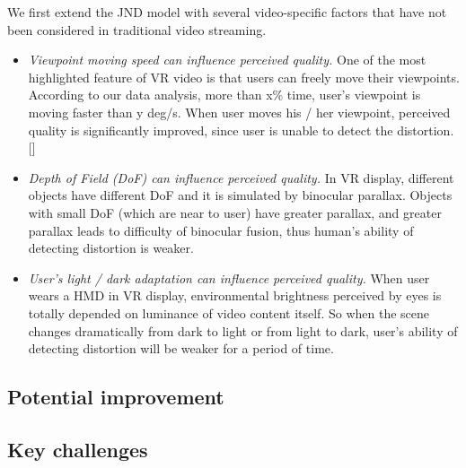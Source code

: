 We first extend the JND model with several \vr video-specific factors that have not been considered in traditional video streaming.

\begin{itemize}

\item \emph{Viewpoint moving speed can influence perceived quality.} One of the most highlighted feature of VR video is that users can freely move their viewpoints. According to our data analysis, more than x\% time, user's viewpoint is moving faster than y deg/s. When user moves his / her viewpoint, perceived quality is significantly improved, since user is unable to detect the distortion. []

\item \emph{Depth of Field (DoF) can influence perceived quality.} In VR display, different objects have different DoF and it is simulated by binocular parallax. Objects with small DoF (which are near to user) have greater parallax, and greater parallax leads to difficulty of binocular fusion, thus human's ability of detecting distortion is weaker.

\item \emph{User's light / dark adaptation can influence perceived quality.} When user wears a HMD in VR display, environmental brightness perceived by eyes is totally depended on luminance of video content itself. So when the scene changes dramatically from dark to light or from light to dark, user's ability of detecting distortion will be weaker for a period of time.

\end{itemize}


\subsection{Potential improvement}


\subsection{Key challenges}





